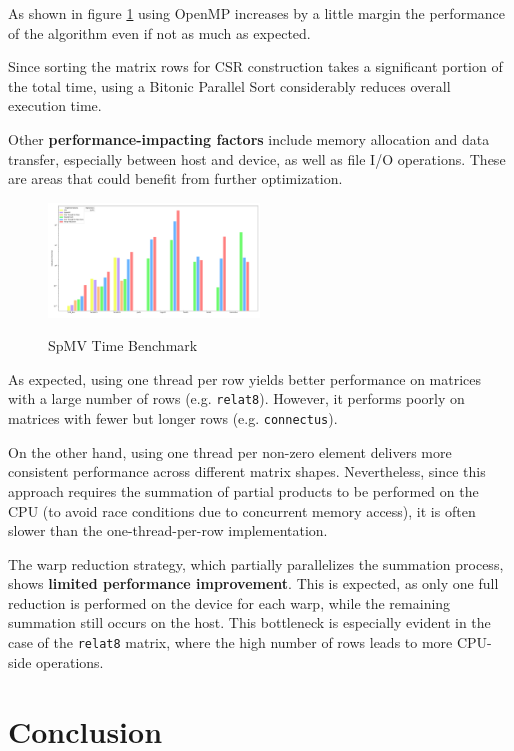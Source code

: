 \documentclass[conference]{IEEEtran}
\begin{document}
    As shown in figure \ref{fig:spmv-benchmark} using OpenMP increases by a
    little margin the performance of the algorithm even if not as much as
    expected.

    Since sorting the matrix rows for CSR construction takes a significant
    portion of the total time, using a Bitonic Parallel Sort considerably
    reduces overall execution time.

    Other \textbf{performance-impacting factors} include memory allocation and
    data transfer, especially between host and device, as well as file I/O
    operations.
    These are areas that could benefit from further optimization.

    \begin{figure}[ht]
        \caption{SpMV Time Benchmark}
        \centering
        \includegraphics[width=0.5\textwidth]{spmv-benchmark.png}
        \label{fig:spmv-benchmark}
    \end{figure}

    As expected, using one thread per row yields better performance on matrices
    with a large number of rows (e.g. \texttt{relat8}).
    However, it performs poorly on matrices with fewer but longer rows (e.g.
    \texttt{connectus}).

    On the other hand, using one thread per non-zero element delivers more
    consistent performance across different matrix shapes.
    Nevertheless, since this approach requires the summation of partial
    products to be performed on the CPU (to avoid race conditions due to
    concurrent memory access), it is often slower than the one-thread-per-row
    implementation.

    The warp reduction strategy, which partially parallelizes the summation
    process, shows \textbf{limited performance improvement}.
    This is expected, as only one full reduction is performed on the device for
    each warp, while the remaining summation still occurs on the host.
    This bottleneck is especially evident in the case of the \texttt{relat8}
    matrix, where the high number of rows leads to more CPU-side operations.

    \section{Conclusion}
\end{document}
